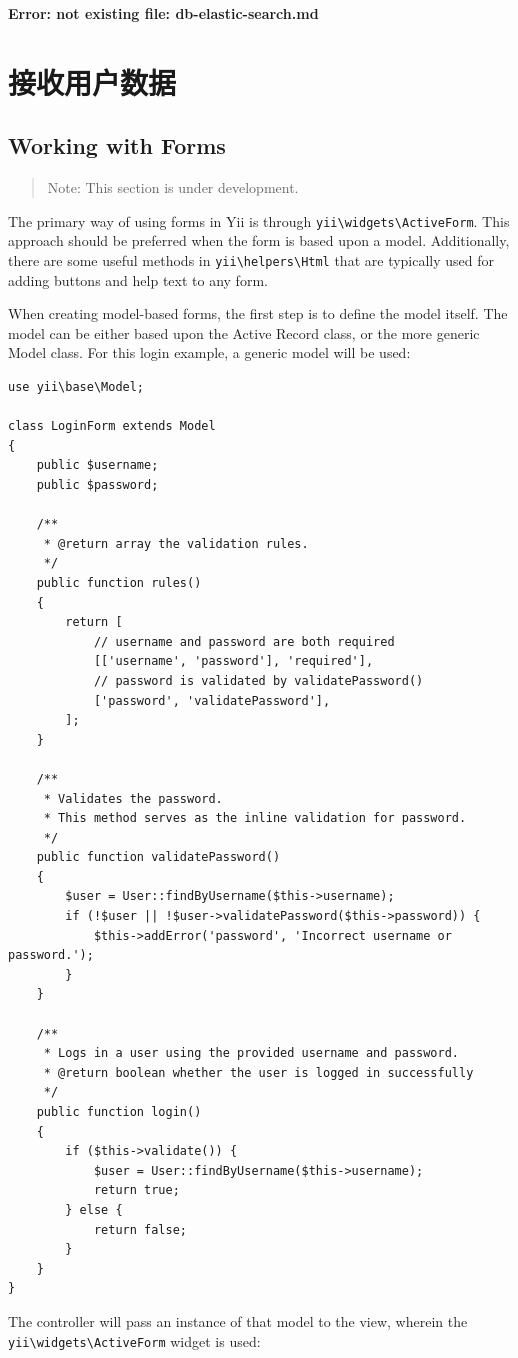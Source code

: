 \newpage\label{db-elastic-search.md}\textbf{Error: not existing file: db-elastic-search.md}\newpage
\chapter{接收用户数据}
\label{input-forms.md}\section{Working with Forms}
\begin{quote}Note: This section is under development.

\end{quote}
The primary way of using forms in Yii is through \texttt{yii{\allowbreak{}\textbackslash}widgets{\allowbreak{}\textbackslash}ActiveForm}. This approach should be preferred when
the form is based upon  a model. Additionally, there are some useful methods in \texttt{yii{\allowbreak{}\textbackslash}helpers{\allowbreak{}\textbackslash}Html} that are typically
used for adding buttons and help text to any form.

When creating model-based forms, the first step is to define the model itself. The model can be either based upon the
Active Record class, or the more generic Model class. For this login example, a generic model will be used:

\lstset{language=php}\begin{lstlisting}
use yii\base\Model;

class LoginForm extends Model
{
    public $username;
    public $password;

    /**
     * @return array the validation rules.
     */
    public function rules()
    {
        return [
            // username and password are both required
            [['username', 'password'], 'required'],
            // password is validated by validatePassword()
            ['password', 'validatePassword'],
        ];
    }

    /**
     * Validates the password.
     * This method serves as the inline validation for password.
     */
    public function validatePassword()
    {
        $user = User::findByUsername($this->username);
        if (!$user || !$user->validatePassword($this->password)) {
            $this->addError('password', 'Incorrect username or password.');
        }
    }

    /**
     * Logs in a user using the provided username and password.
     * @return boolean whether the user is logged in successfully
     */
    public function login()
    {
        if ($this->validate()) {
            $user = User::findByUsername($this->username);
            return true;
        } else {
            return false;
        }
    }
}
\end{lstlisting}
The controller will pass an instance of that model to the view, wherein the \texttt{yii{\allowbreak{}\textbackslash}widgets{\allowbreak{}\textbackslash}ActiveForm} widget is used:


